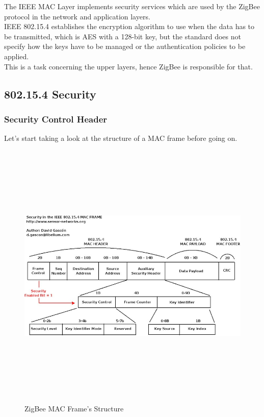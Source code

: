 \documentclass[12pt]{report}
\begin{document}
The IEEE MAC Layer implements security services which are used by the ZigBee protocol in the network and application layers.\\ 
IEEE 802.15.4 establishes the encryption algorithm to use when the data has to be transmitted, which is AES with a 128-bit key, but the standard does not specify how the keys have to be managed or the authentication policies to be applied.\\
This is a task concerning the upper layers, hence ZigBee is responsible for that.

\subsection{802.15.4 Security}
\bigskip

\subsubsection{Security Control Header}
\bigskip
Let's start taking a look at the structure of a MAC frame before going on.\\

\begin{figure}[H]
\includegraphics[width=13cm,height=13cm,keepaspectratio]{mac_frame}
\centering
\caption{ZigBee MAC Frame's Structure}
\end{figure}
\end{document}
